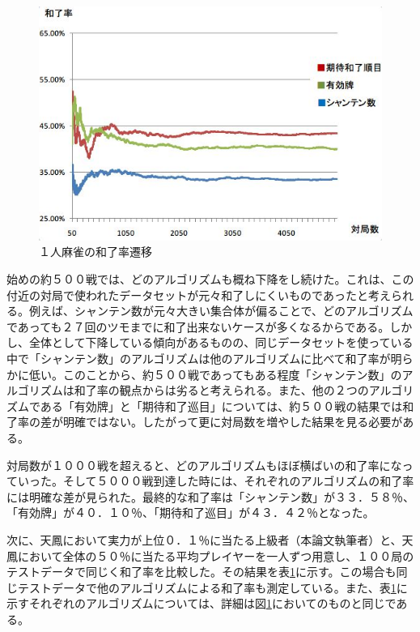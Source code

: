 \begin{figure}[H]
 \centering
 \includegraphics[keepaspectratio, scale=0.8,bb=0 0 549 374]
      {img/1houra.jpg}
 \caption{１人麻雀の和了率遷移}
 \label{1houra}
\end{figure}


始めの約５００戦では、どのアルゴリズムも概ね下降をし続けた。これは、この付近の対局で使われたデータセットが元々和了しにくいものであったと考えられる。例えば、シャンテン数が元々大きい集合体が偏ることで、どのアルゴリズムであっても２７回のツモまでに和了出来ないケースが多くなるからである。しかし、全体として下降している傾向があるものの、同じデータセットを使っている中で「シャンテン数」のアルゴリズムは他のアルゴリズムに比べて和了率が明らかに低い。このことから、約５００戦であってもある程度「シャンテン数」のアルゴリズムは和了率の観点からは劣ると考えられる。また、他の２つのアルゴリズムである「有効牌」と「期待和了巡目」については、約５００戦の結果では和了率の差が明確ではない。したがって更に対局数を増やした結果を見る必要がある。

対局数が１０００戦を超えると、どのアルゴリズムもほぼ横ばいの和了率になっていった。そして５０００戦到達した時には、それぞれのアルゴリズムの和了率には明確な差が見られた。最終的な和了率は「シャンテン数」が３３．５８％、「有効牌」が４０．１０％、「期待和了巡目」が４３．４２％となった。

次に、天鳳において実力が上位０．１％に当たる上級者（本論文執筆者）と、天鳳において全体の５０％に当たる平均プレイヤーを一人ずつ用意し、１００局のテストデータで同じく和了率を比較した。その結果を表\ref{1houra}に示す。この場合も同じテストデータで他のアルゴリズムによる和了率も測定している。また、表\ref{1houra}に示すそれぞれのアルゴリズムについては、詳細は図\ref{1houra}においてのものと同じである。




